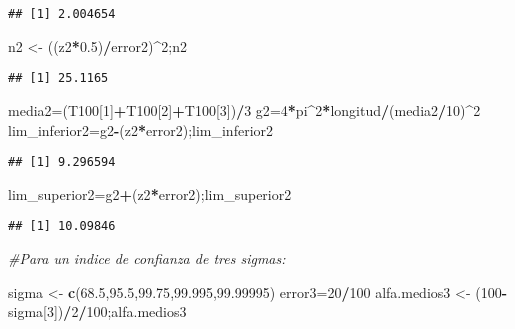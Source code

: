 \documentclass[
]{article}
\newenvironment{Shaded}{\begin{snugshade}}{\end{snugshade}}
\newcommand{\CommentTok}[1]{\textcolor[rgb]{0.56,0.35,0.01}{\textit{#1}}}
\newcommand{\DecValTok}[1]{\textcolor[rgb]{0.00,0.00,0.81}{#1}}
\newcommand{\FloatTok}[1]{\textcolor[rgb]{0.00,0.00,0.81}{#1}}
\newcommand{\FunctionTok}[1]{\textcolor[rgb]{0.13,0.29,0.53}{\textbf{#1}}}
\newcommand{\NormalTok}[1]{#1}
\newcommand{\OtherTok}[1]{\textcolor[rgb]{0.56,0.35,0.01}{#1}}
\newcommand{\SpecialCharTok}[1]{\textcolor[rgb]{0.81,0.36,0.00}{\textbf{#1}}}
\begin{document}
\begin{verbatim}
## [1] 2.004654
\end{verbatim}

\begin{Shaded}
\begin{Highlighting}[]
\NormalTok{n2 }\OtherTok{\textless{}{-}}\NormalTok{ ((z2}\SpecialCharTok{*}\FloatTok{0.5}\NormalTok{)}\SpecialCharTok{/}\NormalTok{error2)}\SpecialCharTok{\^{}}\DecValTok{2}\NormalTok{;n2}
\end{Highlighting}
\end{Shaded}

\begin{verbatim}
## [1] 25.1165
\end{verbatim}

\begin{Shaded}
\begin{Highlighting}[]
\NormalTok{media2}\OtherTok{=}\NormalTok{(T100[}\DecValTok{1}\NormalTok{]}\SpecialCharTok{+}\NormalTok{T100[}\DecValTok{2}\NormalTok{]}\SpecialCharTok{+}\NormalTok{T100[}\DecValTok{3}\NormalTok{])}\SpecialCharTok{/}\DecValTok{3}
\NormalTok{g2}\OtherTok{=}\DecValTok{4}\SpecialCharTok{*}\NormalTok{pi}\SpecialCharTok{\^{}}\DecValTok{2}\SpecialCharTok{*}\NormalTok{longitud}\SpecialCharTok{/}\NormalTok{(media2}\SpecialCharTok{/}\DecValTok{10}\NormalTok{)}\SpecialCharTok{\^{}}\DecValTok{2}
\NormalTok{lim\_inferior2}\OtherTok{=}\NormalTok{g2}\SpecialCharTok{{-}}\NormalTok{(z2}\SpecialCharTok{*}\NormalTok{error2);lim\_inferior2}
\end{Highlighting}
\end{Shaded}

\begin{verbatim}
## [1] 9.296594
\end{verbatim}

\begin{Shaded}
\begin{Highlighting}[]
\NormalTok{lim\_superior2}\OtherTok{=}\NormalTok{g2}\SpecialCharTok{+}\NormalTok{(z2}\SpecialCharTok{*}\NormalTok{error2);lim\_superior2}
\end{Highlighting}
\end{Shaded}

\begin{verbatim}
## [1] 10.09846
\end{verbatim}

\begin{Shaded}
\begin{Highlighting}[]
\CommentTok{\#Para un indice de confianza de tres sigmas:}

\NormalTok{sigma }\OtherTok{\textless{}{-}} \FunctionTok{c}\NormalTok{(}\FloatTok{68.5}\NormalTok{,}\FloatTok{95.5}\NormalTok{,}\FloatTok{99.75}\NormalTok{,}\FloatTok{99.995}\NormalTok{,}\FloatTok{99.99995}\NormalTok{)}
\NormalTok{error3}\OtherTok{=}\DecValTok{20}\SpecialCharTok{/}\DecValTok{100}
\NormalTok{alfa.medios3 }\OtherTok{\textless{}{-}}\NormalTok{ (}\DecValTok{100}\SpecialCharTok{{-}}\NormalTok{sigma[}\DecValTok{3}\NormalTok{])}\SpecialCharTok{/}\DecValTok{2}\SpecialCharTok{/}\DecValTok{100}\NormalTok{;alfa.medios3}
\end{Highlighting}
\end{Shaded}
\end{document}
